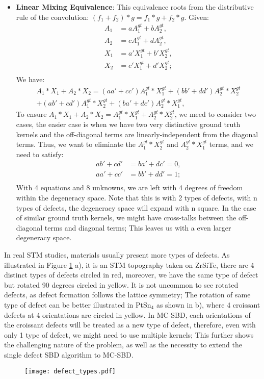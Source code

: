 \begin{itemize}
	\item \textbf{Linear Mixing Equivalence}: This equivalence roots from the distributive rule of the convolution: $(f_1+f_2)*g = f_1*g + f_2*g$. Given: 
	\begin{align*}
		A_1 &= aA_1^{gt}+bA_2^{gt}, \\
		A_2 &= cA_1^{gt}+dA_2^{gt}, \\
		X_1 &= a'X_1^{gt}+b'X_2^{gt}, \\
		X_2 &= c'X_1^{gt}+d'X_2^{gt}; \\
	\end{align*}
	We have: 
	\begin{align*}
		A_1*X_1 +A_2*X_2= (aa'+cc') A_1^{gt}*X_1^{gt}+ (bb'+dd')A_2^{gt}*X_2^{gt} \\+ (ab'+cd') A_1^{gt}*X_2^{gt} +(ba'+dc') A_2^{gt}*X_1^{gt},
	\end{align*}
	To ensure $A_1*X_1 +A_2*X_2 = A_1^{gt}*X_1^{gt} + A_2^{gt}*X_2^{gt}$, we meed to consider two cases, the easier case is when we have two very distinctive ground truth kernels and the off-diagonal terms are linearly-independent from the diagonal terms. Thus, we want to eliminate the $A_1^{gt}*X_2^{gt}$ and $A_2^{gt}*X_1^{gt}$ terms, and we need to satisfy:
	 \begin{align*}
	 	ab'+cd'&= ba' + dc' = 0, \\
	 	aa'+cc'&= bb' + dd' = 1; \\
	 \end{align*}
	 With 4 equations and 8 unknowns, we are left with 4 degrees of freedom within the degeneracy space. Note that this is with 2 types of defects, with n types of defects, the degeneracy space will expand with n square. In the case of similar ground truth kernels, we might have cross-talks between the off-diagonal terms and diagonal terms; This leaves us with a even larger degeneracy space. 
\end{itemize}

In real STM studies, materials usually present more types of defects. As illustrated in Figure \ref{fig:ch6_defect} a), it is an STM topography taken on ZrSiTe, there are 4 distinct types of defects circled in red, moreover, we have the same type of defect but rotated 90 degrees circled in yellow. It is not uncommon to see rotated defects, as defect formation follows the lattice symmetry; The rotation of same type of defect can be better illustrated in PtSn$_4$ as shown in b), where 4 croissant defects at 4 orientations are circled in yellow. In \ac{MC-SBD}, each orientations of the croissant defects will be treated as a new type of defect, therefore, even with only 1 type of defect, we might need to use multiple kernels; This further shows the challenging nature of the problem, as well as the necessity to extend the single defect \ac{SBD} algorithm to \ac{MC-SBD}.

\begin{figure}
	\texttt{[image: defect\_types.pdf]} 
	\centering
	\caption{}
	\label{fig:ch6_defect}
\end{figure}